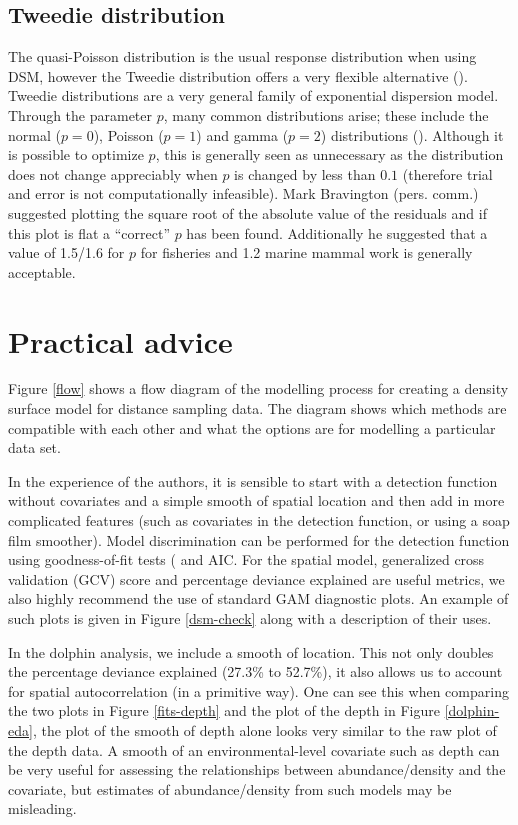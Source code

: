 \documentclass[a4paper,12pt]{article}
\begin{document}
\subsection*{Tweedie distribution}
\label{s:Tweedie}

The quasi-Poisson distribution is the usual response distribution when using DSM, however the Tweedie distribution offers a very flexible alternative (\cite{Candy:2004tb}). Tweedie distributions are a very general family of exponential dispersion model. Through the parameter $p$, many common distributions arise; these include the normal ($p=0$), Poisson ($p=1$) and gamma ($p=2$) distributions (\cite{Jorgensen:1987vg}). Although it is possible to optimize $p$, this is generally seen as unnecessary as the distribution does not change appreciably when $p$ is changed by less than $0.1$ (therefore trial and error is not computationally infeasible). Mark Bravington (pers. comm.) suggested plotting the square root of the absolute value of the residuals and if this plot is flat a ``correct'' $p$ has been found. Additionally he suggested that a value of 1.5/1.6 for $p$ for fisheries and 1.2 marine mammal work is generally acceptable.


\section*{Practical advice}
\label{s:practical}

Figure \ref{flow} shows a flow diagram of the modelling process for creating a density surface model for distance sampling data. The diagram shows which methods are compatible with each other and what the options are for modelling a particular data set.

In the experience of the authors, it is sensible to start with a detection function without covariates and a simple smooth of spatial location and then add in more complicated features (such as covariates in the detection function, or using a soap film smoother). Model discrimination can be performed for the detection function using goodness-of-fit tests (\cite{Buckland:2004ts} and AIC. For the spatial model, generalized cross validation (GCV) score and percentage deviance explained are useful metrics, we also highly recommend the use of standard GAM diagnostic plots. An example of such plots is given in Figure \ref{dsm-check} along with a description of their uses.

In the dolphin analysis, we include a smooth of location. This not only doubles the percentage deviance explained (27.3\% to 52.7\%), it also allows us to account for spatial autocorrelation (in a primitive way). One can see this when comparing the two plots in Figure \ref{fits-depth} and the plot of the depth in Figure \ref{dolphin-eda}, the plot of the smooth of depth alone looks very similar to the raw plot of the depth data. A smooth of an environmental-level covariate such as depth can be very useful for assessing the relationships between abundance/density and the covariate, but estimates of abundance/density from such models may be misleading.
\end{document}
